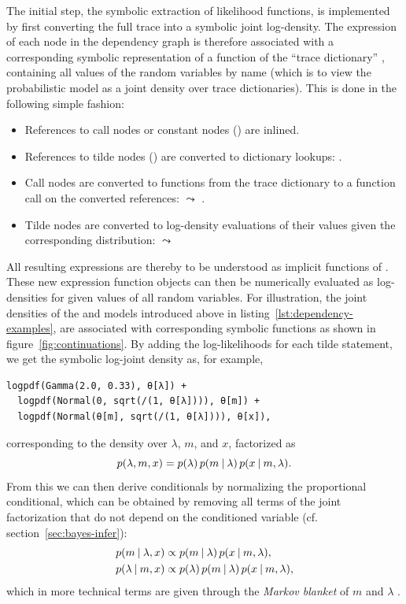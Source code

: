The initial step, the symbolic extraction of likelihood functions, is implemented by first
converting the full trace into a symbolic joint log-density.  The expression of each node in the
dependency graph is therefore associated with a corresponding symbolic representation of a function
of the \enquote{trace dictionary} , containing all values of the random variables by name
(which is to view the probabilistic model as a joint density over trace dictionaries).  This is done
in the following simple fashion:
\begin{itemize}
  \firmlist
\item References to call nodes or constant nodes () are inlined.
\item References to tilde nodes () are converted to dictionary lookups: .
\item Call nodes are converted to functions from the trace dictionary to a
  function call on the converted references:  \(\leadsto\) .
\item Tilde nodes are converted to log-density evaluations of their values given the corresponding
  distribution:  \(\leadsto\) 
\end{itemize}
All resulting expressions are thereby to be understood as implicit functions of .  These
new expression function objects can then be numerically evaluated as log-densities for given values
of all random variables.  For illustration, the joint densities of the  and
 models introduced above in listing~\ref{lst:dependency-examples}, are
associated with corresponding symbolic functions as shown in figure~\ref{fig:continuations}.  By adding the log-likelihoods for each tilde statement, we get the symbolic
log-joint density as, for example,
\begin{lstlisting}
logpdf(Gamma(2.0, 0.33), θ[λ]) + 
  logpdf(Normal(0, sqrt(/(1, θ[λ]))), θ[m]) + 
  logpdf(Normal(θ[m], sqrt(/(1, θ[λ]))), θ[x]),
\end{lstlisting}
corresponding to the density over \(\lambda\), \(m\), and \(x\), factorized as
\begin{equation}
  p(\lambda, m, x) = p(\lambda) \, p(m \:\vert\: \lambda) \, p(x \:\vert\: m, \lambda).
\end{equation}
From this we can then derive conditionals by normalizing the proportional conditional, which can be
obtained by removing all terms of the joint factorization that do not depend on the conditioned
variable (cf. section~\ref{sec:bayes-infer}):
\begin{equation}
  \begin{aligned}
    p(m \:\vert\: \lambda, x) &\propto p(m \:\vert\: \lambda) \, p(x \:\vert\: m, \lambda), \\
    p(\lambda \:\vert\: m, x) &\propto p(\lambda) \, p(m \:\vert\: \lambda) \, p(x \:\vert\: m, \lambda),
  \end{aligned}
\end{equation}
which in more technical terms are given through the \emph{Markov blanket} of \(m\) and \(\lambda\)
\parencites[section 24.2]{murphy2012machine}[section 4.5]{koller2009probabilistic}.

